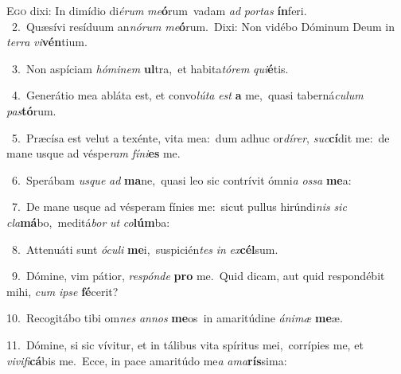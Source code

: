 \lettrine{\initial\textcolor{\initialcolor}{E}}{go} dixi: In dimídio di\-\textit{é}\-\textit{rum} \textit{me}\-\textbf{ó}rum~\star vadam \textit{ad} \textit{por}\-\textit{tas} \textbf{ín}\-feri.\\
{\numbfont\textcolor{\numbcolor}{~2.}}~Quæsívi resíduum an\-\textit{nó}\-\textit{rum} \textit{me}\-\textbf{ó}rum.~\star Dixi: Non vidébo Dóminum Deum in \textit{ter}\-\textit{ra} \textit{vi}\-\textbf{vén}tium.\par
{\numbfont\textcolor{\numbcolor}{~3.}}~Non aspíciam \textit{hó}\-\textit{mi}\textit{nem} \textbf{ul}\-tra,~\star et habita\-\textit{tó}\-\textit{rem} \textit{qui}\-\textbf{é}tis.\par
{\numbfont\textcolor{\numbcolor}{~4.}}~Generátio mea abláta est, et convo\-\textit{lú}\-\textit{ta} \textit{est} \textbf{a} me,~\star quasi taberná\-\textit{cu}\-\textit{lum} \textit{pas}\-\textbf{tó}rum.\par
{\numbfont\textcolor{\numbcolor}{~5.}}~Præcísa est velut a texénte, vita mea:~\dagger dum adhuc or\-\textit{dí}\-\textit{rer}, \textit{suc}\-\textbf{cí}dit me:~\star de mane usque ad véspe\textit{ram} \textit{fí}\-\textit{ni}\textbf{es} me.\par
{\numbfont\textcolor{\numbcolor}{~6.}}~Sperábam \textit{us}\-\textit{que} \textit{ad} \textbf{ma}\-ne,~\star quasi leo sic contrívit ómni\textit{a} \textit{os}\-\textit{sa} \textbf{me}\-a:\par
{\numbfont\textcolor{\numbcolor}{~7.}}~De mane usque ad vésperam fínies me:~\dagger sicut pullus hirúndi\textit{nis} \textit{sic} \textit{cla}\-\textbf{má}bo,~\star meditá\textit{bor} \textit{ut} \textit{co}\-\textbf{lúm}ba:\par
{\numbfont\textcolor{\numbcolor}{~8.}}~Attenuáti sunt \textit{ó}\-\textit{cu}\textit{li} \textbf{me}\-i,~\star suspicién\textit{tes} \textit{in} \textit{ex}\-\textbf{cél}sum.\par
{\numbfont\textcolor{\numbcolor}{~9.}}~Dómine, vim pátior, \textit{re}\-\textit{spón}\textit{de} \textbf{pro} me.~\star Quid dicam, aut quid respondébit mihi, \textit{cum} \textit{ip}\-\textit{se} \textbf{fé}\-cerit?\par
{\numbfont\textcolor{\numbcolor}{10.}}~Recogitábo tibi om\textit{nes} \textit{an}\-\textit{nos} \textbf{me}\-os~\star in amaritúdine \textit{á}\-\textit{ni}\textit{mæ} \textbf{me}\-æ.\par
{\numbfont\textcolor{\numbcolor}{11.}}~Dómine, si sic vívitur, et in tálibus vita spíritus mei,~\dagger corrípies me, et \textit{vi}\-\textit{vi}\textit{fi}\textbf{cá}bis me.~\star Ecce, in pace amaritúdo me\textit{a} \textit{a}\-\textit{ma}\textbf{rís}sima:\par
